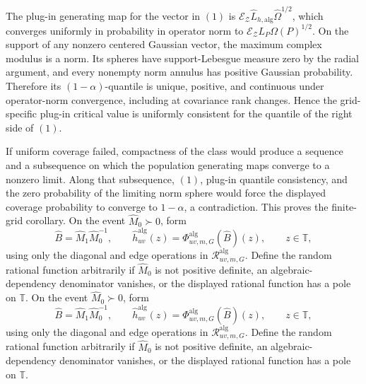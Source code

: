 The plug-in generating map for the vector in \((1)\) is \(\mathcal E_{\mathcal Z}\widehat L_{h,\mathrm{alg}}\widehat\Omega^{1/2}\), which converges uniformly in probability in operator norm to \(\mathcal E_{\mathcal Z}L_P\Omega(P)^{1/2}\).  On the support of any nonzero centered Gaussian vector, the maximum complex modulus is a norm.  Its spheres have support-Lebesgue measure zero by the radial argument, and every nonempty norm annulus has positive Gaussian probability.  Therefore its \((1-\alpha)\)-quantile is unique, positive, and continuous under operator-norm convergence, including at covariance rank changes.  Hence the grid-specific plug-in critical value is uniformly consistent for the quantile of the right side of \((1)\).

If uniform coverage failed, compactness of the class would produce a sequence and a subsequence on which the population generating maps converge to a nonzero limit.  Along that subsequence, \((1)\), plug-in quantile consistency, and the zero probability of the limiting norm sphere would force the displayed coverage probability to converge to \(1-\alpha\), a contradiction.  This proves the finite-grid corollary.
On the event \(\widehat M_0\succ0\), form
\[
 \widehat B=\widehat M_1\widehat M_0^{-1},
 \qquad
 \widehat h_{uv}^{\mathrm{alg}}(z)
 =\Phi^{\mathrm{alg}}_{uv,m,G}(\widehat B)(z),
 \qquad z\in\mathbb T,
\]
using only the diagonal and edge operations in \(\mathscr R^{\mathrm{alg}}_{uv,m,G}\).  Define the random rational function arbitrarily if \(\widehat M_0\) is not positive definite, an algebraic-dependency denominator vanishes, or the displayed rational function has a pole on \(\mathbb T\).
On the event \(\widehat M_0\succ0\), form
\[
 \widehat B=\widehat M_1\widehat M_0^{-1},
 \qquad
 \widehat h_{uv}^{\mathrm{alg}}(z)
 =\Phi^{\mathrm{alg}}_{uv,m,G}(\widehat B)(z),
 \qquad z\in\mathbb T,
\]
using only the diagonal and edge operations in \(\mathscr R^{\mathrm{alg}}_{uv,m,G}\).  Define the random rational function arbitrarily if \(\widehat M_0\) is not positive definite, an algebraic-dependency denominator vanishes, or the displayed rational function has a pole on \(\mathbb T\).
